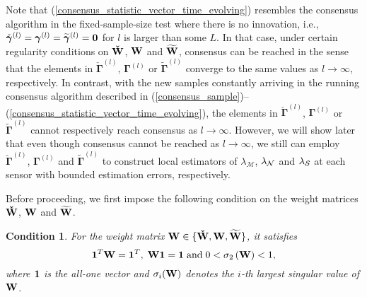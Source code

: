 \documentclass[11pt, draftclsnofoot, onecolumn]{IEEEtran}
\newtheorem{condition}{Condition}
\newcommand{\bW}{\bf{W}}
\newcommand{\cM}{\mathcal{M}}
\newcommand{\bgamma}{{\boldsymbol{\gamma}}}
\newcommand{\cbgamma}{{\check{\boldsymbol{\gamma}}}}
\newcommand{\tbgamma}{{\widetilde{\boldsymbol{\gamma}}}}
\newcommand{\bGamma}{{\boldsymbol{\Gamma}}}
\newcommand{\cbGamma}{{\check{\boldsymbol{\Gamma}}}}
\newcommand{\tbGamma}{{\widetilde{\boldsymbol{\Gamma}}}}
\newcommand{\cW}{{\check{W}}}
\newcommand{\tW}{{\widetilde{W}}}
\begin{document}
Note that (\ref{consensus_statistic_vector_time_evolving}) resembles the consensus algorithm in the fixed-sample-size test where there is no innovation, i.e.,
 $\cbgamma^{(l)}=\bgamma^{(l)}=\tbgamma^{(l)}={\bf 0}$ for $l$ is larger than some $L$. In that case, under certain regularity conditions on ${\bf{\cW}}$, ${\bf{W}}$ and ${\bf{\tW}}$, consensus can be reached in the sense that the elements in ${\cbGamma ^{\left( l \right)}}$, ${\bGamma ^{\left( l \right)}}$ or ${\tbGamma ^{\left( l \right)}}$ converge to the same values as $l \to \infty$, respectively.
In contrast, with the new samples constantly arriving in the running consensus algorithm described in (\ref{consensus_sample})--(\ref{consensus_statistic_vector_time_evolving}), the elements in ${\cbGamma ^{\left( l \right)}}$, ${\bGamma ^{\left( l \right)}}$ or ${\tbGamma ^{\left( l \right)}}$ cannot respectively reach consensus as $l \to \infty$. However, we will show later that even though consensus cannot be reached as $l \to \infty$, we  still can employ ${\cbGamma ^{\left( l \right)}}$, ${\bGamma ^{\left( l \right)}}$ and ${\tbGamma ^{\left( l \right)}}$ to construct local estimators of ${\lambda _\cM}$, ${\lambda _{\cal N}} $ and ${\lambda _{\cal S}}$ at each sensor with bounded estimation   errors,   respectively.

Before proceeding, we first impose the following condition on the weight matrices ${\bf{\cW}}$, ${\bf{W}}$ and ${\bf{\tW}}$.
\begin{condition} \label{Condition_W}
	For the weight matrix $\bW \in \{ {\bf{\cW}},  {\bf{W}}, \bf{\tW} \}$, it satisfies
	\begin{equation}
	{{\bf{1}}^T}{\bf{W}} = {{\bf{1}}^T}, \; {\bf{W1}} = {\bf{1}} \; \text{and} \; 0 < {\sigma _2}\left( {\bf{W}} \right) < 1,
	\end{equation}
	where ${\bf{1}}$ is the all-one vector and ${\sigma _i}( {\bf{W}} )$ denotes the $i$-th largest singular value of $\bf{W}$.
\end{condition}
\end{document}
